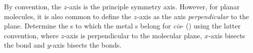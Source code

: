 \begin{problem}
    By convention, the $z$-axis is the principle symmetry axis. However, for planar molecules, it is also common to define the $z$-axis as the axis \emph{perpendicular} to the plane. Determine the \irrep{}s to which the metal \dorb{}s belong for \textit{cis}- () using the latter convention, where $z$-axis is perpendicular to the molecular plane, $x$-axis bisects the  bond and $y$-axis bisects the  bonds.
\end{problem}